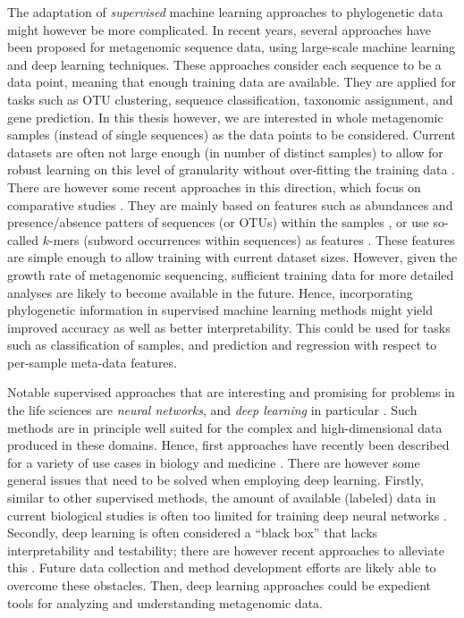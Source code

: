 The adaptation of \emph{supervised} machine learning approaches to phylogenetic data might however be more complicated.
In recent years, several approaches have been proposed for metagenomic sequence data,
using large-scale machine learning \cite{Vervier2015,Soueidan2015}
and deep learning \cite{Angermueller2016,Fiannaca2018} techniques.
These approaches consider each sequence to be a data point, meaning that enough training data are available.
They are applied for tasks such as OTU clustering, sequence classification, taxonomic assignment, and gene prediction.
In this thesis however, we are interested in whole metagenomic samples (instead of single sequences)
as the data points to be considered.
Current datasets are often not large enough (in number of distinct samples)
to allow for robust learning on this level of granularity without over-fitting the training data \cite{Angermueller2016}.
There are however some recent approaches in this direction, which focus on comparative studies \cite{Soueidan2015}.
They are mainly based on features such as
abundances and presence/absence patters of sequences (or \acsp{OTU}) within the samples \cite{Pasolli2016},
or use so-called $k$-mers (subword occurrences within sequences) as features \cite{Asgari2015}.
These features are simple enough to allow training with current dataset sizes.
However, given the growth rate of metagenomic sequencing,
sufficient training data for more detailed analyses are likely to become available in the future.
Hence, incorporating phylogenetic information in supervised machine learning methods might yield
improved accuracy as well as better interpretability.
This could be used for tasks such as classification of samples,
and prediction and regression with respect to per-sample meta-data features.

Notable supervised approaches that are interesting and promising for problems in the life sciences
are \emph{neural networks}, and \emph{deep learning} in particular \cite{Skansi2018}.
Such methods are in principle well suited for the complex and high-dimensional data produced in these domains.
Hence, first approaches have recently been described
for a variety of use cases in biology and medicine \cite{Mamoshina2016,Min2017,Ching2018}.
There are however some general issues that need to be solved when employing deep learning.
Firstly, similar to other supervised methods, the amount of available (labeled) data in current biological studies
is often too limited for training deep neural networks \cite{Min2017,Ching2018}.
Secondly, deep learning is often considered a ``black box'' that lacks interpretability and testability;
there are however recent approaches to alleviate this \cite{Min2017,Reiman2018}.
Future data collection and method development efforts are likely able to overcome these obstacles.
Then, deep learning approaches could be expedient tools for analyzing and understanding metagenomic data.

